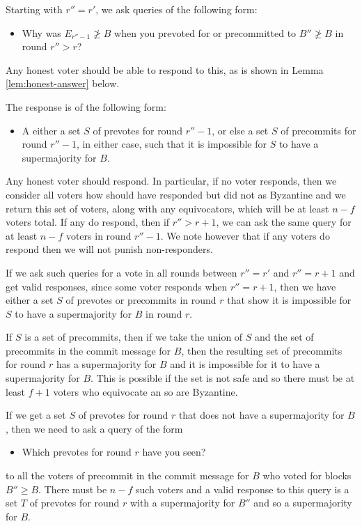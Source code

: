 \documentclass[a4paper,UKenglish,cleveref, autoref, thm-restate, anonymous]{lipics-v2019}
\begin{document}
Starting with $r''=r' $, we ask queries of the following form: 
\begin{itemize}
\item Why was $E_{r''-1} \not\geq B$  when you prevoted for or precommitted to $B'' \not\geq B$ in round $r'' > r$?
\end{itemize}
\noindent Any honest voter should be able to respond to this, as is shown in Lemma \ref{lem:honest-answer} below. 

The response is of the following form:
\begin{itemize}
\item A either a set $S$ of prevotes for round $r''-1$, or else a set $S$ of precommits for round $r''-1$, in either case, such that it is impossible for $S$ to have a supermajority for $B$.
\end{itemize}

Any honest voter should respond.  In particular, if no voter responds, then we consider all voters how should have responded but did not as Byzantine and we return this set of voters, along with any equivocators, which will be at least $n-f$ voters total. If any do respond, then if $r'' > r+1$, we can ask the same query for at least $n-f$ voters in round $r''-1$. We note however that if any voters do respond then we will not punish non-responders.

If we ask such queries for a vote in all rounds between $r''=r'$ and $r''=r+1$ and get valid responses, since some voter responds when $r''=r+1$, then we have either a set $S$ of prevotes or precommits in round $r$ that show it is impossible for $S$ to have a supermajority for $B$ in round $r$.

If $S$ is a set of precommits, then if we take the union of $S$ and the set of precommits in the commit message for $B$, then the resulting set of precommits for round $r$ has a supermajority for $B$ and it is impossible for it to have a supermajority for $B$. This is possible if the set is not safe and so there must be at least $f+1$ voters who equivocate an so are Byzantine.

If we get a set $S$ of prevotes for round $r$ that does not have a supermajority for $B$, then we need to ask a query of the form

\begin{itemize}
\item Which prevotes for round $r$ have you seen?
\end{itemize}
\noindent to all the voters of precommit in the commit message for $B$  who voted for blocks $B'' \geq B$. There must be $n-f$ such voters and a valid response to this query is a set $T$ of prevotes for round $r$ with a supermajority for $B''$ and so a supermajority for $B$.
\end{document}
